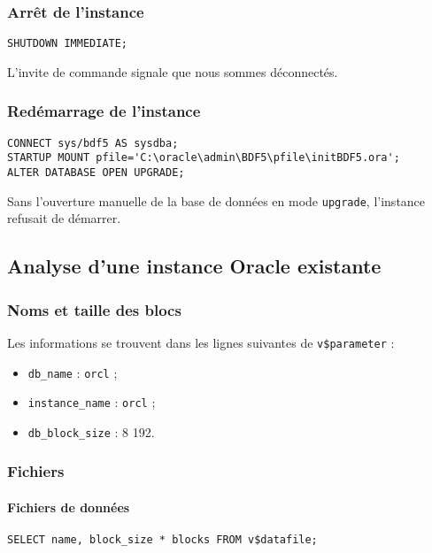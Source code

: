 \subsubsection{Arrêt de l’instance}

\begin{verbatim}
SHUTDOWN IMMEDIATE;
\end{verbatim}

L’invite de commande signale que nous sommes déconnectés.

\subsubsection{Redémarrage de l’instance}

\begin{verbatim}
CONNECT sys/bdf5 AS sysdba;
STARTUP MOUNT pfile='C:\oracle\admin\BDF5\pfile\initBDF5.ora';
ALTER DATABASE OPEN UPGRADE;
\end{verbatim}

Sans l’ouverture manuelle de la base de données en mode
\verb|upgrade|, l’instance refusait de démarrer.

\subsection{Analyse d’une instance Oracle existante}
\subsubsection{Noms et taille des blocs}

Les informations se trouvent dans les lignes suivantes de \verb|v$parameter| :
\begin{itemize}
	\item \verb|db_name| : \verb|orcl| ;
	\item \verb|instance_name| : \verb|orcl| ;
	\item \verb|db_block_size| : 8 192.
\end{itemize}

\subsubsection{Fichiers}

\paragraph{Fichiers de données}
\begin{verbatim}
SELECT name, block_size * blocks FROM v$datafile;
\end{verbatim}


